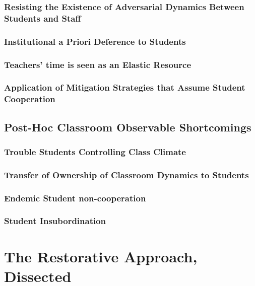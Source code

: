 \documentclass[12pt]{article}
\begin{document}
	\subsubsection{Resisting the Existence of Adversarial Dynamics Between Students and Staff}
	\subsubsection{Institutional a Priori Deference to Students}
	\subsubsection{Teachers' time is seen as an Elastic Resource}
	\subsubsection{Application of Mitigation Strategies that Assume Student Cooperation}

	\subsection{Post-Hoc Classroom Observable Shortcomings}
	\subsubsection{Trouble Students Controlling Class Climate}
	\subsubsection{Transfer of Ownership of Classroom Dynamics to Students}
	\subsubsection{Endemic Student non-cooperation}
	\subsubsection{Student Insubordination}
	
	
	\section{The Restorative Approach, Dissected}
\end{document}
